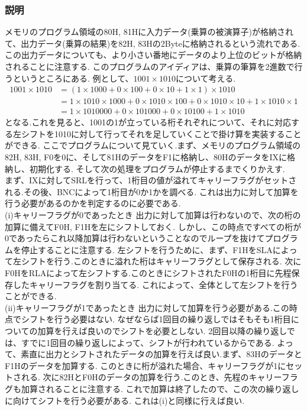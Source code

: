 \documentclass[titlepage]{jsarticle}
\theoremstyle{definition}
\begin{document}
\subsubsection{説明}
メモリのプログラム領域の80H, 81Hに入力データ(乗算の被演算子)が格納されて、出力データ(乗算の結果)を82H, 83Hの2Byteに格納されるという流れである.
この出力データについても、より小さい番地にデータのより上位のビットが格納されることに注意する.
このプログラムのアイディアは、乗算の筆算を2進数で行うというところにある.
例として、$1001 \times 1010$について考える.
\begin{equation*}
	\begin{split}
		1001 \times 1010 &= (1 \times 1000 + 0 \times 100 + 0 \times 10 + 1 \times 1) \times 1010 \\
		&= 1 \times 1010 \times 1000 + 0 \times 1010 \times 100 + 0 \times 1010 \times 10 + 1 \times 1010 \times 1 \\
		&= 1 \times 1010000 + 0 \times 101000 + 0 \times 10100 + 1 \times 1010
	\end{split}
\end{equation*}
となる.これを見ると、1001の1が立っている桁それぞれについて、それに対応する左シフトを1010に対して行ってそれを足していくことで掛け算を実装することができる.
ここでプログラムについて見ていく.まず、メモリのプログラム領域の82H, 83H, F0を0に、そして81HのデータをF1に格納し、80HのデータをIXに格納し、初期化する.
そして次の処理をプログラムが停止するまでくりかえす. \\
まず、IXに対してSRLを行って、1桁目の値が溢れてキャリーフラグがセットされる.その後、BNCによって1桁目が0か1かを調べる.
これは出力に対して加算を行う必要があるのかを判定するのに必要である.\\
($\mathrm{i}$)キャリーフラグが0であったとき
出力に対して加算は行わないので、次の桁の加算に備えてF0H, F1Hを左にシフトしておく.
しかし、この時点ですべての桁が0であったらこれ以降加算は行わないということなのでループを抜けてプログラムを停止することに注意する.
左シフトを行うために、まず、F1HをSLAによって左シフトを行う.このときに溢れた桁はキャリーフラグとして保存される.
次にF0HをRLAによって左シフトする.このときにシフトされたF0Hの1桁目に先程保存したキャリーフラグを割り当てる.
これによって、全体として左シフトを行うことができる. \\
($\mathrm{ii}$)キャリーフラグが1であったとき
出力に対して加算を行う必要がある.この時点でシフトを行う必要はない.
なぜならば1回目の繰り返しではそもそも1桁目についての加算を行えば良いのでシフトを必要としない.
2回目以降の繰り返しでは、すでに1回目の繰り返しによって、シフトが行われているからである.
よって、素直に出力とシフトされたデータの加算を行えば良い.まず、83HのデータとF1Hのデータを加算する.
このときに桁が溢れた場合、キャリーフラグが1にセットされる.
次に82HとF0Hのデータの加算を行う.このとき、先程のキャリーフラグも加算されることに注意する.
これで加算は終了したので、この次の繰り返しに向けてシフトを行う必要がある.
これは($\mathrm{i}$)と同様に行えば良い.
\end{document}
